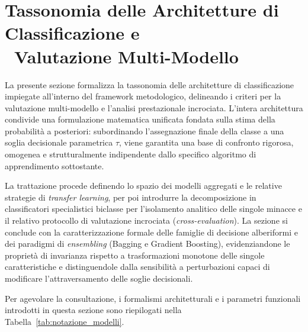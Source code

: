 \section[Tassonomia delle Architetture di Classificazione e Valutazione Multi-Modello]{Tassonomia delle Architetture di Classificazione e \\\ Valutazione Multi-Modello}
\label{sec:tassonomia_modelli}

La presente sezione formalizza la tassonomia delle architetture di classificazione impiegate all'interno del framework metodologico, delineando i criteri per la valutazione multi-modello e l'analisi prestazionale incrociata. 
L'intera architettura condivide una formulazione matematica unificata fondata sulla stima della probabilità a posteriori: subordinando l'assegnazione finale della classe a una soglia decisionale parametrica $\tau$, viene garantita una base di confronto rigorosa, omogenea e strutturalmente indipendente dallo specifico algoritmo di apprendimento sottostante. 

La trattazione procede definendo lo spazio dei modelli aggregati e le relative strategie di \textit{transfer learning}, per poi introdurre la decomposizione in classificatori specialistici biclasse per l'isolamento analitico delle singole minacce e il relativo protocollo di valutazione incrociata (\textit{cross-evaluation}). La sezione si conclude con la caratterizzazione formale delle famiglie di decisione alberiformi e dei paradigmi di \textit{ensembling} (Bagging e Gradient Boosting), evidenziandone le proprietà di invarianza rispetto a trasformazioni monotone delle singole caratteristiche e distinguendole dalla sensibilità a perturbazioni capaci di modificare l'attraversamento delle soglie decisionali.

Per agevolare la consultazione, i formalismi architetturali e i parametri funzionali introdotti in questa sezione sono riepilogati nella Tabella~\ref{tab:notazione_modelli}.


